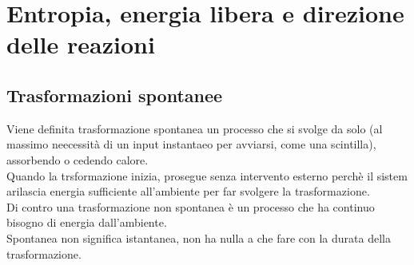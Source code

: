 \section{Entropia, energia libera e direzione delle reazioni}
\subsection{Trasformazioni spontanee}
Viene definita trasformazione spontanea un processo che si svolge da solo (al massimo neecessità di un input instantaeo per avviarsi, come una scintilla), assorbendo o cedendo calore.\\
Quando la trsformazione inizia, prosegue senza intervento esterno perchè il sistem arilascia energia sufficiente all'ambiente per far svolgere la trasformazione.\\
Di contro una trasformazione non spontanea è un processo che ha continuo bisogno di energia dall'ambiente.\\
Spontanea non significa istantanea, non ha nulla a che fare con la durata della trasformazione.
